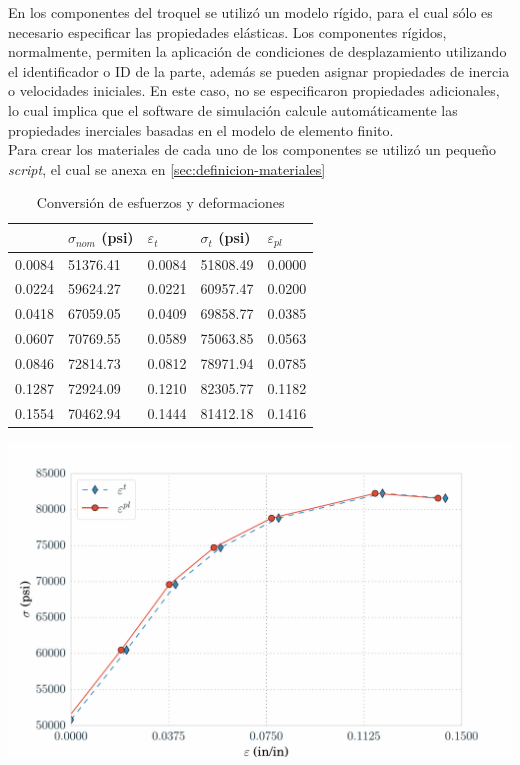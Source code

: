 En los componentes del troquel se utilizó un modelo rígido, para el cual sólo es necesario 
especificar las propiedades elásticas. Los componentes rígidos, normalmente, permiten la 
aplicación de condiciones de desplazamiento utilizando el identificador o ID de la parte, además 
se pueden asignar propiedades de inercia o velocidades iniciales. En este caso, no se 
especificaron propiedades adicionales, lo cual implica que el software de simulación calcule automáticamente 
las propiedades inerciales basadas en el modelo de elemento finito. \\

Para crear los materiales de cada uno de los componentes se utilizó un pequeño \textit{script}, el 
cual se anexa en \ref{sec:definicion-materiales}


\begin{table}[h]
\centering
\caption{Conversión de esfuerzos y deformaciones}
\label{tab:strain_stress_conversion}
\begin{tabular}{p{2.5cm} p{2.5cm} p{2.5cm} p{2.5cm} p{2.5cm}} \hline
{\bf $\varepsilon_{nom}$ & $\sigma_{nom}$ (psi) & $\varepsilon_t$ & $\sigma_t$ (psi) & $\varepsilon_{pl}$ } \\
\hline
0.0084 & 51376.41 & 0.0084 & 51808.49 & 0.0000 \\
0.0224 & 59624.27 & 0.0221 & 60957.47 & 0.0200 \\
0.0418 & 67059.05 & 0.0409 & 69858.77 & 0.0385 \\
0.0607 & 70769.55 & 0.0589 & 75063.85 & 0.0563 \\
0.0846 & 72814.73 & 0.0812 & 78971.94 & 0.0785 \\
0.1287 & 72924.09 & 0.1210 & 82305.77 & 0.1182 \\
0.1554 & 70462.94 & 0.1444 & 81412.18 & 0.1416 \\
\hline
\end{tabular}
\label{tab:stress_strain_curve}
\end{table}


\begin{center}
\includegraphics[scale=0.6]{src/ch3/ls_dyna_material_curve.pdf}
\label{fig:ls_dyna_material_curve}
\end{center}

